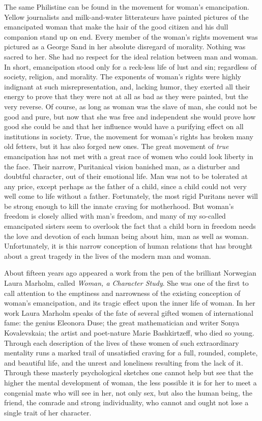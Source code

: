 The same Philistine can be found in the movement for woman's
emancipation. Yellow journalists and milk-and-water litterateurs have
painted pictures of the e\-man\-ci\-pat\-ed woman that make the hair
of the good citizen and his dull companion stand up on end. Every
member of the woman's rights movement was pictured as a George Sand in
her absolute disregard of morality. Nothing was sacred to her. She had
no respect for the ideal relation between man and woman. In short,
emancipation stood only for a reck-less life of lust and
sin; regardless of society, religion, and morality. The exponents of
woman's rights were highly indignant at such misrepresentation, and,
lacking humor, they exerted all their energy to prove that they were
not at all as bad as they were painted, but the very reverse. Of
course, as long as woman was the slave of man, she could not be good
and pure, but now that she was free and independent she would prove
how good she could be and that her influence would have a purifying
effect on all institutions in society. True, the movement for woman's
rights has broken many old fetters, but it has also forged new ones.
The great movement of \textit{true} emancipation has not met with a
great race of women who could look liberty in the face. Their narrow,
Puritanical vision banished man, as a disturber and doubtful
character, out of their emotional life. Man was not to be tolerated at
any price, except perhaps as the father of a child, since a child
could not very well come to life without a father. Fortunately, the
most rigid Puritans never will be strong enough to kill the innate
craving for motherhood. But woman's freedom is closely allied with
man's freedom, and many of my so-called emancipated sisters seem to
overlook the fact that a child born in freedom needs the love and
devotion of each human being about him, man as well as woman.
Unfortunately, it is this narrow conception of human relations that
has brought about a great tragedy in the lives of the modern man and
woman.

About fifteen years ago appeared a work from the pen of the brilliant
Norwegian Laura Marholm, called \textit{Woman, a Character Study}. She
was one of  the first to call attention to the emptiness and
narrowness of the existing conception of woman's emancipation, and its
tragic effect upon the inner life of woman. In her work Laura Marholm
speaks of the fate of several gifted women of international fame: the
genius Eleonora Duse; the great mathematician and writer Sonya
Kovalevskaia; the artist and poet-nature Marie Bashkirtzeff, who died
so young. Through each description of the lives of these women of such
extraordinary mentality runs a marked trail of unsatisfied craving for
a full, rounded, complete, and beautiful life, and the unrest and
loneliness resulting from the lack of it. Through these masterly
psychological sketches one cannot help but see that the higher the
mental development of woman, the less possible it is for her to meet a
congenial mate who will see in her, not only sex, but also the human
being, the friend, the comrade and strong individuality, who cannot
and ought not lose a single trait of her character.

